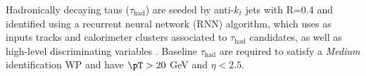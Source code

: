 Hadronically decaying taus ($\tau_\mathrm{had}$) are seeded by anti-$k_t$ jets with R=0.4 and identified using a recurrent neural network (RNN) algorithm, which uses
as inputs tracks and calorimeter clusters associated to $\tau_\mathrm{had}$ candidates, as well as high-level discriminating
variables \cite{ATL-PHYS-PUB-2019-033}. Baseline $\tau_\mathrm{had}$ are required to satisfy a \textit{Medium} identification WP and have $\pT>20$ GeV and $\eta < 2.5$.  